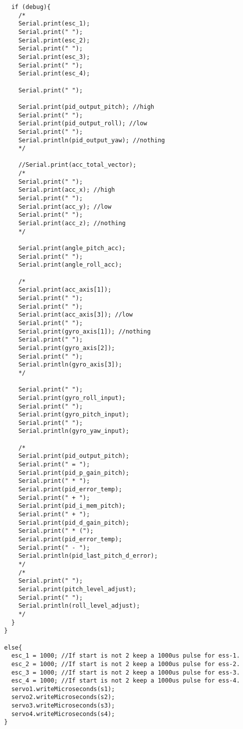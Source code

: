 \begin{lstlisting}
    if (debug){
      /*
      Serial.print(esc_1);
      Serial.print(" ");
      Serial.print(esc_2);
      Serial.print(" ");
      Serial.print(esc_3);
      Serial.print(" ");
      Serial.print(esc_4);
      
      Serial.print(" ");
      
      Serial.print(pid_output_pitch); //high
      Serial.print(" ");
      Serial.print(pid_output_roll); //low
      Serial.print(" ");
      Serial.println(pid_output_yaw); //nothing
      */
      
      //Serial.print(acc_total_vector);
      /*
      Serial.print(" ");
      Serial.print(acc_x); //high
      Serial.print(" ");
      Serial.print(acc_y); //low
      Serial.print(" ");
      Serial.print(acc_z); //nothing
      */
      
      Serial.print(angle_pitch_acc);
      Serial.print(" ");
      Serial.print(angle_roll_acc);
      
      /*
      Serial.print(acc_axis[1]);
      Serial.print(" ");
      Serial.print(" ");
      Serial.print(acc_axis[3]); //low
      Serial.print(" ");
      Serial.print(gyro_axis[1]); //nothing
      Serial.print(" ");
      Serial.print(gyro_axis[2]);
      Serial.print(" ");
      Serial.println(gyro_axis[3]);
      */
      
      Serial.print(" ");
      Serial.print(gyro_roll_input);
      Serial.print(" ");
      Serial.print(gyro_pitch_input);
      Serial.print(" ");
      Serial.println(gyro_yaw_input);
      
      /*
      Serial.print(pid_output_pitch);
      Serial.print(" = ");
      Serial.print(pid_p_gain_pitch);
      Serial.print(" * ");
      Serial.print(pid_error_temp);
      Serial.print(" + ");
      Serial.print(pid_i_mem_pitch);
      Serial.print(" + ");
      Serial.print(pid_d_gain_pitch);
      Serial.print(" * (");
      Serial.print(pid_error_temp);
      Serial.print(" - ");
      Serial.println(pid_last_pitch_d_error);
      */
      /*
      Serial.print(" ");
      Serial.print(pitch_level_adjust);
      Serial.print(" ");
      Serial.println(roll_level_adjust);
      */
    }
  }

  else{
    esc_1 = 1000; //If start is not 2 keep a 1000us pulse for ess-1.
    esc_2 = 1000; //If start is not 2 keep a 1000us pulse for ess-2.
    esc_3 = 1000; //If start is not 2 keep a 1000us pulse for ess-3.
    esc_4 = 1000; //If start is not 2 keep a 1000us pulse for ess-4.
    servo1.writeMicroseconds(s1);
    servo2.writeMicroseconds(s2);
    servo3.writeMicroseconds(s3);
    servo4.writeMicroseconds(s4);
  }


\end{lstlisting}
